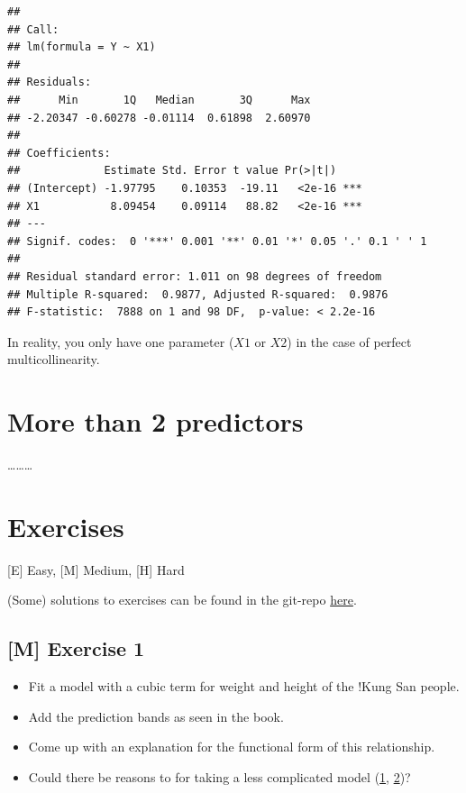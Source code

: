 \documentclass[
]{book}
\providecommand{\tightlist}{%
  \setlength{\itemsep}{0pt}\setlength{\parskip}{0pt}}
\begin{document}
\begin{verbatim}
## 
## Call:
## lm(formula = Y ~ X1)
## 
## Residuals:
##      Min       1Q   Median       3Q      Max 
## -2.20347 -0.60278 -0.01114  0.61898  2.60970 
## 
## Coefficients:
##             Estimate Std. Error t value Pr(>|t|)    
## (Intercept) -1.97795    0.10353  -19.11   <2e-16 ***
## X1           8.09454    0.09114   88.82   <2e-16 ***
## ---
## Signif. codes:  0 '***' 0.001 '**' 0.01 '*' 0.05 '.' 0.1 ' ' 1
## 
## Residual standard error: 1.011 on 98 degrees of freedom
## Multiple R-squared:  0.9877, Adjusted R-squared:  0.9876 
## F-statistic:  7888 on 1 and 98 DF,  p-value: < 2.2e-16
\end{verbatim}

In reality, you only have one parameter (\(X1\) or \(X2\)) in the case of perfect multicollinearity.

\section{More than 2 predictors}\label{more-than-2-predictors}

\ldots\ldots\ldots{}

\section{Exercises}\label{exercises-2}

{[}E{]} Easy, {[}M{]} Medium, {[}H{]} Hard

(Some) solutions to exercises can be found in the git-repo \href{https://github.com/jdegenfellner/Script_QM2_ZHAW/tree/main/Solutions_Exercises}{here}.

\subsection{{[}M{]} Exercise 1}\label{exercise1_multiple_regression}

\begin{itemize}
\tightlist
\item
  Fit a model with a cubic term for weight and height of the !Kung San people.
\item
  Add the prediction bands as seen in the book.
\item
  Come up with an explanation for the functional form of this relationship.
\item
  Could there be reasons to for taking a less complicated model
  (\href{https://en.wikipedia.org/wiki/Statistical_model_specification}{1}, \href{https://en.wikipedia.org/wiki/Occam\%27s_razor}{2})?
\end{itemize}
\end{document}
